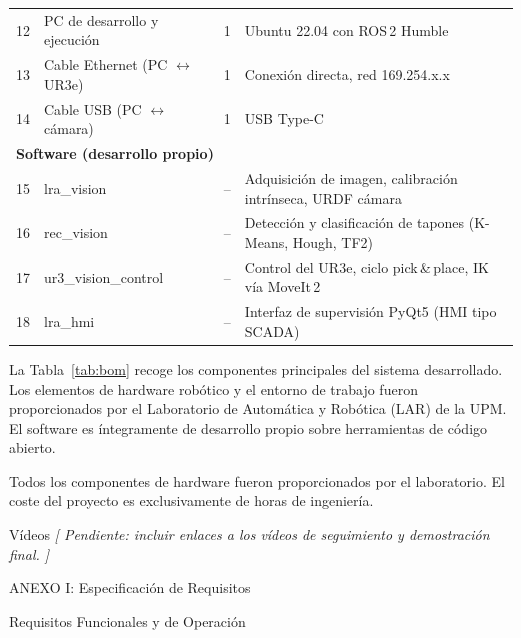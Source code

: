 \documentclass[12pt,a4paper]{article}
\makeatletter
\newcommand{\secfmt}[1]{%
  \noindent\colorbox{BlueHeader}{%
    \parbox[b]{\dimexpr\linewidth-2\fboxsep}{%
      \vspace{5pt}%
      \textcolor{white}{\large\bfseries #1}%
      \vspace{5pt}%
    }%
  }\par\vspace{4pt}%
}
\renewcommand\section{%
  \@ifstar\section@star\section@nostar
}
\newcommand\section@nostar[1]{%
  \refstepcounter{section}%
  \addcontentsline{toc}{section}{\protect\numberline{\thesection}#1}%
  \secfmt{\thesection.\enspace #1}%
}
\newcommand\section@star[1]{%
  \secfmt{#1}%
}
\newcommand{\subsecfmt}[1]{%
  {\large\bfseries\color{MediumBlue}#1}%
  \par\vspace{2pt}%
}
\renewcommand\subsection{%
  \@ifstar\subsection@star\subsection@nostar
}
\newcommand\subsection@nostar[1]{%
  \refstepcounter{subsection}%
  \addcontentsline{toc}{subsection}{\protect\numberline{\thesubsection}#1}%
  \vspace{10pt}%
  \subsecfmt{\thesubsection.\enspace #1}%
  \vspace{2pt}%
}
\newcommand\subsection@star[1]{%
  \vspace{10pt}\subsecfmt{#1}\vspace{2pt}%
}
\newcommand{\rowA}{\rowcolor{LightGray}}
\newcommand{\rowB}{\rowcolor{white}}
\makeatother
\begin{document}
\begin{table}[H]
\begin{tabularx}{\textwidth}{|c|>{\RaggedRight\arraybackslash}X|c|>{\RaggedRight\arraybackslash}X|}
  \hline
  \rowB 12 & PC de desarrollo y ejecución & 1 & Ubuntu 22.04 con ROS\,2 Humble \\
  \rowA 13 & Cable Ethernet (PC $\leftrightarrow$ UR3e) & 1 & Conexión directa, red 169.254.x.x \\
  \rowB 14 & Cable USB (PC $\leftrightarrow$ cámara) & 1 & USB Type-C \\
  \hline
  \multicolumn{4}{|l|}{\cellcolor{BlueCell}\bfseries Software (desarrollo propio)} \\
  \hline
  \rowA 15 & lra\_vision & -- & Adquisición de imagen, calibración intrínseca, URDF cámara \\
  \rowB 16 & rec\_vision & -- & Detección y clasificación de tapones (K-Means, Hough, TF2) \\
  \rowA 17 & ur3\_vision\_control & -- & Control del UR3e, ciclo pick\,\&\,place, IK vía MoveIt\,2 \\
  \rowB 18 & lra\_hmi & -- & Interfaz de supervisión PyQt5 (HMI tipo SCADA) \\
  \hline
\end{tabularx}
\end{table}

\clearpage
La Tabla~\ref{tab:bom} recoge los componentes principales del sistema desarrollado.
Los elementos de hardware robótico y el entorno de trabajo fueron proporcionados por
el Laboratorio de Automática y Robótica (LAR) de la UPM. El software es íntegramente
de desarrollo propio sobre herramientas de código abierto.

Todos los componentes de hardware fueron proporcionados por el laboratorio. El coste del
proyecto es exclusivamente de horas de ingeniería.

\section{Vídeos}
\textit{[ Pendiente: incluir enlaces a los vídeos de seguimiento y demostración final. ]}

\section{ANEXO I: Especificación de Requisitos}

\subsection{Requisitos Funcionales y de Operación}
\end{document}
